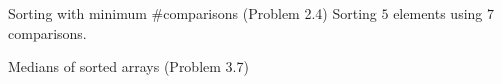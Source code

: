 \begin{frame}{Sorting with minimum \#comparisons (Problem 2.4)}
  Sorting $5$ elements using $7$ comparisons.
\end{frame}
\begin{frame}{Medians of sorted arrays (Problem 3.7)}

\end{frame}

